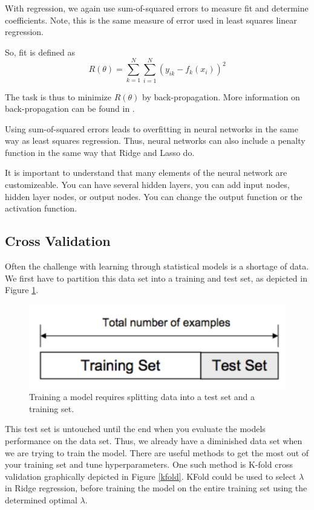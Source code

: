\documentclass[12pt]{article}
\begin{document}
With regression, we again use sum-of-squared errors to measure fit and determine coefficients. Note, this is the same measure of error used in least squares linear regression.

So, fit is defined as 
$$R(\theta) = \sum_{k=1}^{N} \sum_{i=1}^{N} (y_{ik} - f_k(x_i))^2$$ 

The task is thus to minimize $R(\theta)$ by back-propagation. More information on back-propagation can be found in \cite[354]{springer}. 

Using sum-of-squared errors leads to overfitting in neural networks in the same way as least squares regression. Thus, neural networks can also include a penalty function in the same way that Ridge and Lasso do. 

It is important to understand that many elements of the neural network are customizeable. You can have several hidden layers, you can add input nodes, hidden layer nodes, or output nodes. You can change the output function or the activation function. 
\subsection{Cross Validation}
Often the challenge with learning through statistical models is a shortage of data. We first have to partition this data set into a training and test set, as depicted in Figure \ref{test_train}.

\begin{figure}[ht]
	\centering
	\includegraphics[width=.5\textwidth]{test_train.png}
	\caption{Training a model requires splitting data into a test set and a training set. \cite{kfold}}
	\label{test_train}
\end{figure}

This test set is untouched until the end when you evaluate the models performance on the data set. Thus, we already have a diminished data set when we are trying to train the model. There are useful methods to get the most out of your training set and tune hyperparameters. One such method is K-fold cross validation graphically depicted in Figure \ref{kfold}. KFold could be used to select $\lambda$ in Ridge regression, before training the model on the entire training set using the determined optimal $\lambda$.
\end{document}
